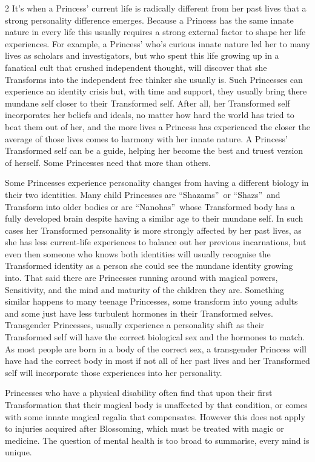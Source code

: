 \begin{multicols}{2}
It's when a Princess' current life is radically different from her past lives that a strong personality difference emerges. Because a Princess has the same innate nature in every life this usually requires a strong external factor to shape her life experiences. For example, a Princess' who's curious innate nature led her to many lives as scholars and investigators, but who spent this life growing up in a fanatical cult that crushed independent thought, will discover that she Transforms into the independent free thinker she usually is. Such Princesses can experience an identity crisis but, with time and support, they usually bring there mundane self closer to their Transformed self. After all, her Transformed self incorporates her beliefs and ideals, no matter how hard the world has tried to beat them out of her, and the more lives a Princess has experienced the closer the average of those lives comes to harmony with her innate nature. A Princess' Transformed self can be a guide, helping her become the best and truest version of herself. Some Princesses need that more than others. 

Some Princesses experience personality changes from having a different biology in their two identities. Many child Princesses are \textquotedblleft Shazams\textquotedblright\, or \textquotedblleft Shazs\textquotedblright\, and Transform into older bodies or are \textquotedblleft Nanohas\textquotedblright\, whose Transformed body has a fully developed brain despite having a similar age to their mundane self. In such cases her Transformed personality is more strongly affected by her past lives, as she has less current-life experiences to balance out her previous incarnations, but even then someone who knows both identities will usually recognise the Transformed identity as a person she could see the mundane identity growing into. That said there are Princesses running around with magical powers, Sensitivity, and the mind and maturity of the children they are. Something similar happens to many teenage Princesses, some transform into young adults and some just have less turbulent hormones in their Transformed selves. Transgender Princesses, usually experience a personality shift as their Transformed self will have the correct biological sex and the 
hormones to match. As most people are born in a body of the correct sex, a transgender Princess will have had the correct body in most if not all of her past lives and her Transformed self will incorporate those experiences into her personality. 

Princesses who have a physical disability often find that upon their first Transformation that their magical body is unaffected by that condition, or comes with some innate magical regalia that compensates. However this does not apply to injuries acquired after Blossoming, which must be treated with magic or medicine. The question of mental health is too broad to summarise, every mind is unique.


\end{multicols}
